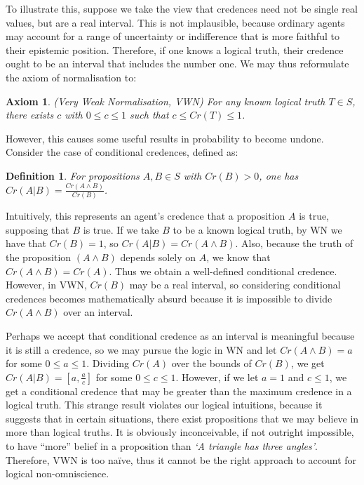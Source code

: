 \documentclass[12pt]{article}
\newtheorem{definition}{Definition}
\newtheorem{axiom}{Axiom}
\begin{document}
To illustrate this, suppose we take the view that credences need not be single real values, but are a real interval. This is not implausible, because ordinary agents may account for a range of uncertainty or indifference that is more faithful to their epistemic position. Therefore, if one knows a logical truth, their credence ought to be an interval that includes the number one.\autocite{sep} We may thus reformulate the axiom of normalisation to:
\begin{axiom}
    (Very Weak Normalisation, VWN) For any known logical truth $T\in S$, there exists $c$ with $0\leq c\leq 1$ such that $c\leq Cr(T)\leq1$.
\end{axiom}
However, this causes some useful results in probability to become undone. Consider the case of conditional credences, defined as:
\begin{definition}
    For propositions $A,B\in S$ with $Cr(B)>0$, one has $Cr(A|B)=\frac{Cr(A\land B)}{Cr(B)}$.
\end{definition}
Intuitively, this represents an agent's credence that a proposition $A$ is true, supposing that $B$ is true.\autocite[32]{bdrc} If we take $B$ to be a known logical truth, by WN we have that $Cr(B)=1$, so $Cr(A|B)=Cr(A\land B)$. Also, because the truth of the proposition $(A\land B)$ depends solely on $A$, we know that $Cr(A\land B)=Cr(A)$. Thus we obtain a well-defined conditional credence. However, in VWN, $Cr(B)$ may be a real interval, so considering conditional credences becomes mathematically absurd because it is impossible to divide $Cr(A\land B)$ over an interval.

Perhaps we accept that conditional credence as an interval is meaningful because it is still a credence, so we may pursue the logic in WN and let $Cr(A\land B)=a$ for some $0\leq a\leq1$. Dividing $Cr(A)$ over the bounds of $Cr(B)$, we get $Cr(A|B)=[a,\frac{a}{c}]$ for some $0\leq c\leq1$. However, if we let $a=1$ and $c\leq 1$, we get a conditional credence that may be greater than the maximum credence in a logical truth. This strange result violates our logical intuitions, because it suggests that in certain situations, there exist propositions that we may believe in more than logical truths. It is obviously inconceivable, if not outright impossible, to have ``more'' belief in a proposition than \textit{`A triangle has three angles'}. Therefore, VWN is too na\"ive, thus it cannot be the right approach to account for logical non-omniscience.
\end{document}
